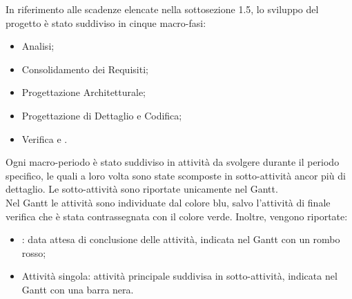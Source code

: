 In riferimento alle scadenze elencate nella sottosezione 1.5, lo sviluppo del progetto è stato suddiviso in cinque macro-fasi:
\begin{itemize}
\item{Analisi;}
\item{Consolidamento dei Requisiti;}
\item{Progettazione Architetturale;}
\item{Progettazione di Dettaglio e Codifica;}
\item{Verifica e .}
\end{itemize}

Ogni macro-periodo è stato suddiviso in attività da svolgere durante il periodo specifico, le quali a loro volta sono state scomposte in sotto-attività ancor più di dettaglio. Le sotto-attività sono riportate unicamente nel Gantt. \\ Nel Gantt le attività sono individuate dal colore blu, salvo l'attività di finale verifica che è stata contrassegnata con il colore verde. Inoltre, vengono riportate:
\begin{itemize}
\item{: data attesa di conclusione delle attività, indicata nel Gantt con un rombo rosso;}
\item{Attività singola: attività principale suddivisa in sotto-attività, indicata nel Gantt con una barra nera.}
\end{itemize}






\pagebreak
